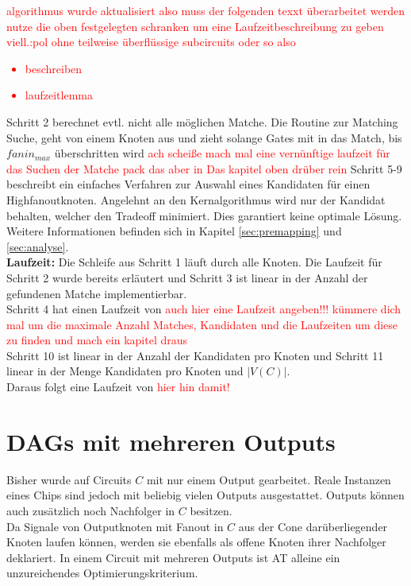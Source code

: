 \documentclass[11pt, a4paper, german]{article}
\begin{document}
\textcolor{red}{algorithmus wurde aktualisiert also muss der folgenden texxt überarbeitet werden nutze die oben festgelegten schranken um eine Laufzeitbeschreibung zu geben viell.:pol ohne teilweise überflüssige subcircuits oder so also \begin{itemize}
\item beschreiben 
\item laufzeitlemma
\end{itemize}}
Schritt 2 berechnet evtl. nicht alle möglichen Matche. Die Routine zur Matching Suche, geht von einem Knoten aus und zieht solange Gates mit in das Match, bis $fanin_{max}$ überschritten wird \textcolor{red}{ach scheiße mach mal eine vernünftige laufzeit für das Suchen der Matche pack das aber in Das kapitel oben drüber rein}
Schritt 5-9 beschreibt ein einfaches Verfahren zur Auswahl eines Kandidaten für einen Highfanoutknoten. Angelehnt an den Kernalgorithmus wird nur der Kandidat behalten, welcher den Tradeoff minimiert. Dies garantiert keine optimale Lösung. Weitere Informationen befinden sich in Kapitel \ref{sec:premapping} und \ref{sec:analyse}. \\
{\bf Laufzeit: } Die Schleife aus Schritt 1 läuft durch alle Knoten. Die Laufzeit für Schritt 2 wurde bereits erläutert und Schritt 3 ist linear in der Anzahl der gefundenen Matche implementierbar. \\
Schritt 4 hat einen Laufzeit von \textcolor{red}{auch hier eine Laufzeit angeben!!! kümmere dich mal um die maximale Anzahl Matches, Kandidaten und die Laufzeiten um diese zu finden und mach ein kapitel draus }\\
Schritt 10 ist linear in der Anzahl der Kandidaten pro Knoten und Schritt 11 linear in der Menge Kandidaten pro Knoten und $|V(C)|$.\\
Daraus folgt eine Laufzeit von \textcolor{red}{hier hin damit!}



\section{DAGs mit mehreren Outputs}
\label{sec:outputs}
Bisher wurde auf Circuits $C$ mit nur einem Output gearbeitet. Reale Instanzen eines Chips sind jedoch mit beliebig vielen Outputs ausgestattet. Outputs können auch zusätzlich noch Nachfolger in $C$ besitzen. \\

 Da Signale von Outputknoten mit Fanout in $C$ aus der Cone darüberliegender Knoten laufen können, werden sie ebenfalls als offene Knoten ihrer Nachfolger deklariert. In einem Circuit mit mehreren Outputs ist AT alleine ein unzureichendes Optimierungskriterium.
\end{document}
